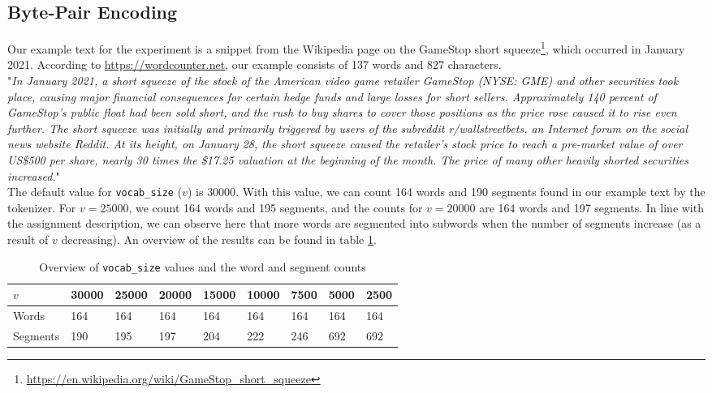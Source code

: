 \documentclass[a4paper, 11pt]{article}
\begin{document}
\subsection{Byte-Pair Encoding}

Our example text for the experiment is a snippet from the Wikipedia page on the GameStop short squeeze\footnote{\url{https://en.wikipedia.org/wiki/GameStop_short_squeeze}}, which occurred in January 2021. According to \url{https://wordcounter.net}, our example consists of 137 words and 827 characters.\\

"\textit{In January 2021, a short squeeze of the stock of the American video game retailer GameStop (NYSE: GME) and other securities took place, causing major financial consequences for certain hedge funds and large losses for short sellers. Approximately 140 percent of GameStop's public float had been sold short, and the rush to buy shares to cover those positions as the price rose caused it to rise even further. The short squeeze was initially and primarily triggered by users of the subreddit r/wallstreetbets, an Internet forum on the social news website Reddit. At its height, on January 28, the short squeeze caused the retailer's stock price to reach a pre-market value of over US\$500 per share, nearly 30 times the \$17.25 valuation at the beginning of the month. The price of many other heavily shorted securities increased.}"\\

The default value for \texttt{vocab\_size} ($v$) is $30000$. With this value, we can count 164 words and 190 segments found in our example text by the tokenizer. For $v=25000$, we count 164 words and 195 segments, and the counts for $v=20000$ are 164 words and 197 segments. In line with the assignment description, we can observe here that more words are segmented into subwords when the number of segments increase (as a result of $v$ decreasing). An overview of the results can be found in table \ref{tab:tokenizer_results}.

\begin{table}[h]
	\centering
	\begin{tabular}{l|l|l|l|l|l|l|l|l}
	$v$		 & 30000 & 25000 & 20000  & 15000 & 10000 & 7500 & 5000 & 2500\\ \hline
	Words 	 & 164 	 & 164   & 164    & 164   & 164   & 164  & 164  & 164\\ 
	Segments & 190   & 195   & 197    & 204	  & 222   & 246  & 692  & 692
	\end{tabular}
	\caption{Overview of \texttt{vocab\_size} values and the word and segment counts}
	\label{tab:tokenizer_results}
\end{table}
\end{document}
